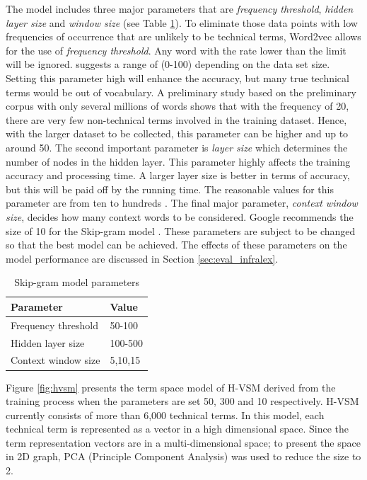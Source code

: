 \documentclass[Journal, BackFigs, DoubleSpace]{ascelike} %
\begin{document}
%
\par
The model includes three major parameters that are \textit{frequency threshold}, \textit{hidden layer size} and \textit{window size} (see Table \ref{table:nn-parameters}). To eliminate those data points with low frequencies of occurrence that are unlikely to be technical terms, Word2vec allows for the use of \textit{frequency threshold}. Any word with the rate lower than the limit will be ignored.  suggests a range of (0-100) depending on the data set size. Setting this parameter high will enhance the accuracy, but many true technical terms would be out of vocabulary. A preliminary study based on the preliminary corpus with only several millions of words shows that with the frequency of 20, there are very few non-technical terms involved in the training dataset. Hence, with the larger dataset to be collected, this parameter can be higher and up to around 50. The second important parameter is \textit{layer size} which determines the number of nodes in the hidden layer. This parameter highly affects the training accuracy and processing time. A larger layer size is better in terms of accuracy, but this will be paid off by the running time. The reasonable values for this parameter are from ten to hundreds \cite{rehurek14}. The final major parameter, \textit{context window size}, decides how many context words to be considered. Google recommends the size of 10 for the Skip-gram model \cite{google2016}. These parameters are subject to be changed so that the best model can be achieved. The effects of these parameters on the model performance are discussed in Section \ref{sec:eval_infralex}.
%
\begin{table} [t]
	\caption{Skip-gram model parameters}
	\label{table:nn-parameters}
	\centering
	\small
	\renewcommand{\arraystretch}{1.25}
	\begin{tabular}{l l}
		\hline
		\textbf{Parameter} & \textbf{Value}\\
		\hline
		Frequency threshold & 50-100\\
		Hidden layer size		&	100-500\\
		Context window size	&	5,10,15\\
		\hline
	\end{tabular}
	\normalsize
\end{table}
%
\par
Figure \ref{fig:hvsm} presents the term space model of H-VSM derived from the training process when the parameters are set 50, 300 and 10 respectively. H-VSM currently consists of more than 6,000 technical terms. In this model, each technical term is represented as a vector in a high dimensional space. Since the term representation vectors are in a multi-dimensional space; to present the space in 2D graph, PCA (Principle Component Analysis) was used to reduce the size to 2.
\end{document}
